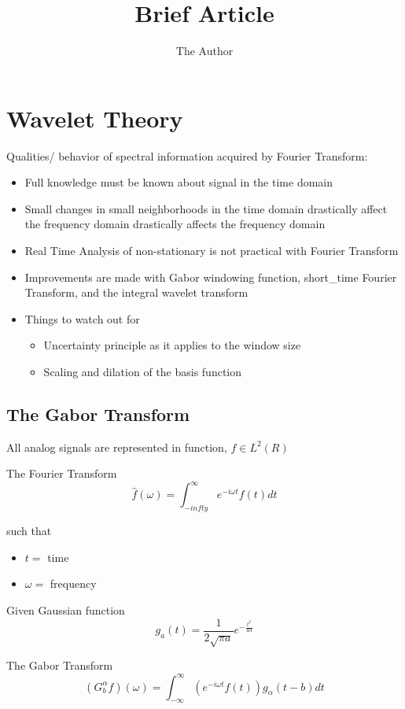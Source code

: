 \documentclass[11pt]{article}
\title{Brief Article}
\author{The Author}
\begin{document}
\maketitle


\section {Wavelet Theory}

Qualities/ behavior of spectral information acquired by Fourier Transform:
\begin{itemize}
\item Full knowledge must be known about signal in the time domain
\item Small changes in small neighborhoods in the time domain drastically affect the frequency domain drastically affects the frequency domain
\item Real Time Analysis of non-stationary is not practical with Fourier Transform
\item Improvements are made with Gabor windowing function, short\_time Fourier Transform, and the integral wavelet transform 
\item Things to watch out for
\begin{itemize}
\item Uncertainty principle as it applies to the window size
\item Scaling and dilation of the basis function
\end{itemize}

\end{itemize}
 
\subsection {The Gabor Transform}
All analog signals are represented in function, $f\in L^2(R)$

The Fourier Transform 
\[\hat{f}(\omega) = \int ^\infty _{-infty} e^{-i \omega t} f(t)dt \]

such that 
\begin{itemize}
\item $t = $ time 
\item $\omega = $ frequency
\end{itemize}

Given Gaussian function 
\[ g_a (t) = \frac{1}{2\sqrt{\pi a}} e^{-\frac{t^2}{4\alpha}} \]

The Gabor Transform 
\[ (G^\alpha _b f) (\omega) = \int ^\infty _{-\infty } (e^{-i\omega t} f(t)) g_\alpha (t-b)dt \]
\end{document}
